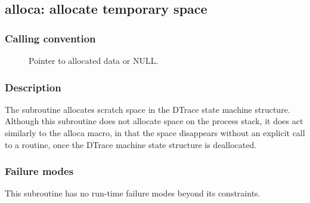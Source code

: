 \clearpage
{}
{}
\label{subr:alloca}
\subsection*{alloca: allocate temporary space}

\subsubsection*{Calling convention}

\begin{description}
\item[] Pointer to allocated data or NULL.
\end{description}

\subsubsection*{Description}

The  subroutine allocates scratch space in the
DTrace state machine structure.  Although this subroutine does not
allocate space on the process stack, it does act similarly to the
alloca macro, in that the space disappears without an explicit call to
a  routine, once the DTrace machine state structure
is deallocated.

\subsubsection*{Failure modes}

This subroutine has no run-time failure modes beyond its constraints.
